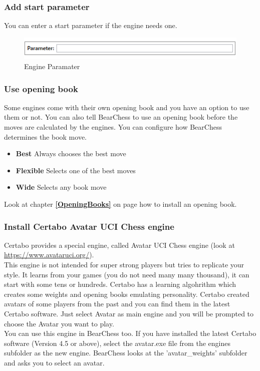 \documentclass[11pt,a4paper]{article}
\begin{document}
	\subsubsection{Add start parameter}
	You can enter a start parameter if the engine needs one.
	\begin{figure}[H]
		\centering
		\includegraphics[scale=0.9]{engineParameter.png}
		\caption{Engine Paramater}
		\label{fig:EngineParameter}
	\end{figure}
	
	\subsubsection{Use opening book}
	Some engines come with their own opening book and you have an option to use them or not. You can also tell BearChess to use an opening book before the moves are calculated by the engines. You can configure how BearChess determines the book move. 
	\begin{itemize}
		\item \textbf{Best} Always chooses the best move
		\item \textbf{Flexible} Selects one of the best moves
		\item \textbf{Wide} Selects any book move
	\end{itemize}
	Look at chapter \textbf{\ref{OpeningBooks}  } on page \pageref{OpeningBooks} how to install an opening book.
	
	\subsubsection{Install Certabo Avatar UCI Chess engine}
	Certabo provides a special engine, called Avatar UCI Chess engine (look at \url{https://www.avataruci.org/}).\\
	This engine is not intended for super strong players but tries to replicate your style. It learns from your games (you do not need many many thousand), it can start with some tens or hundreds. Certabo has a learning algohrithm which creates some weights and opening books emulating personality. Certabo created avatars of some players from the past and you can find them in the latest Certabo software. Just select Avatar as main engine and you will be prompted to choose the Avatar you want to play.\\
	You can use this engine in BearChess too. 
	If you have installed the latest Certabo software (Version 4.5 or above), select the avatar.exe file from the engines subfolder as the new engine. BearChess looks at the 'avatar\_weights' subfolder and asks you to select an avatar.
	
\end{document}
